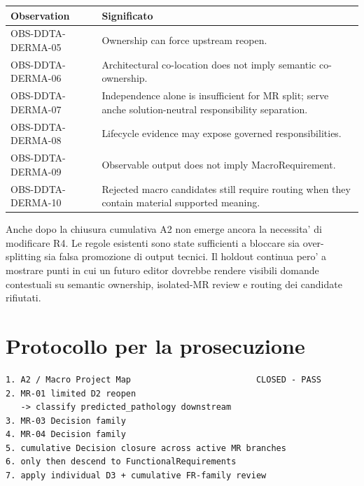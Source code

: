 \documentclass[11pt,a4paper]{article}
\begin{document}
\begin{tabularx}{\textwidth}{L{42mm}Y}
\toprule
\textbf{Observation} & \textbf{Significato} \\
\midrule
OBS-DDTA-DERMA-05 & Ownership can force upstream reopen. \\
OBS-DDTA-DERMA-06 & Architectural co-location does not imply semantic co-ownership. \\
OBS-DDTA-DERMA-07 & Independence alone is insufficient for MR split; serve anche solution-neutral responsibility separation. \\
OBS-DDTA-DERMA-08 & Lifecycle evidence may expose governed responsibilities. \\
OBS-DDTA-DERMA-09 & Observable output does not imply MacroRequirement. \\
OBS-DDTA-DERMA-10 & Rejected macro candidates still require routing when they contain material supported meaning. \\
\bottomrule
\end{tabularx}

\begin{ddtaprinciple}[title={Valutazione provvisoria}]
Anche dopo la chiusura cumulativa A2 non emerge ancora la necessita' di modificare R4. Le regole esistenti sono state sufficienti a bloccare sia over-splitting sia falsa promozione di output tecnici. Il holdout continua pero' a mostrare punti in cui un futuro editor dovrebbe rendere visibili domande contestuali su semantic ownership, isolated-MR review e routing dei candidate rifiutati.
\end{ddtaprinciple}

\section{Protocollo per la prosecuzione}

\begin{ddtacore}[title={Next authorized sequence after A2 closure}]
\begin{lstlisting}
1. A2 / Macro Project Map                         CLOSED - PASS
2. MR-01 limited D2 reopen
   -> classify predicted_pathology downstream
3. MR-03 Decision family
4. MR-04 Decision family
5. cumulative Decision closure across active MR branches
6. only then descend to FunctionalRequirements
7. apply individual D3 + cumulative FR-family review
\end{lstlisting}
\end{ddtacore}
\end{document}
